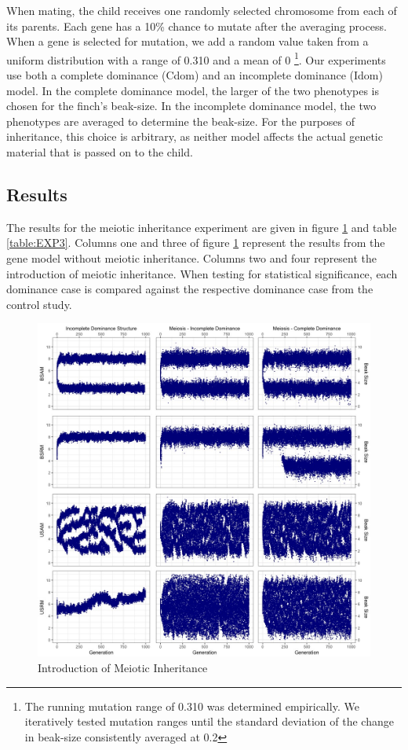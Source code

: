 \documentclass{article}
\begin{document}
When mating, the child receives one randomly selected chromosome from each of its parents. Each gene has a 10\% chance to mutate after the averaging process. When a gene is selected for mutation, we add a random value taken from a uniform distribution with a range of 0.310 and a mean of 0 \footnote{The running mutation range of 0.310 was determined empirically. We iteratively tested mutation ranges until the standard deviation of the change in beak-size consistently averaged at 0.2}. Our experiments use both a complete dominance (Cdom) and an incomplete dominance (Idom) model. In the complete dominance model, the larger of the two phenotypes is chosen for the finch's beak-size. In the incomplete dominance model, the two phenotypes are averaged to determine the beak-size. For the purposes of inheritance, this choice is arbitrary, as neither model affects the actual genetic material that is passed on to the child. 

\subsection{Results}

The results for the meiotic inheritance experiment are given in figure \ref{fig:EXP3} and table \ref{table:EXP3}. Columns one and three of figure \ref{fig:EXP3} represent the results from the gene model without meiotic inheritance. Columns two and four represent the introduction of meiotic inheritance. When testing for statistical significance, each dominance case is compared against the respective dominance case from the control study. 

\begin{figure}
    \centering
    \includegraphics[width=\linewidth]{Data/EXP3}
    \caption{Introduction of Meiotic Inheritance}
    \label{fig:EXP3}
\end{figure}
\end{document}
